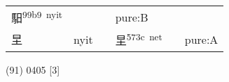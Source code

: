 \documentclass[14pt,a4paper]{scrartcl}
\begin{document}
\begin{longtable}[c]{@{}llllll@{}}
\begin{minipage}[t]{0.14\columnwidth}\raggedright\strut
馹\textsuperscript{99b9~nyit}
\strut\end{minipage} &
\begin{minipage}[t]{0.14\columnwidth}\raggedright\strut
\strut\end{minipage} &
\begin{minipage}[t]{0.14\columnwidth}\raggedright\strut
\strut\end{minipage} &
\begin{minipage}[t]{0.14\columnwidth}\raggedright\strut
pure:B
\strut\end{minipage}\tabularnewline
\begin{minipage}[t]{0.14\columnwidth}\raggedright\strut
圼
\strut\end{minipage} &
\begin{minipage}[t]{0.14\columnwidth}\raggedright\strut
nyit
\strut\end{minipage} &
\begin{minipage}[t]{0.14\columnwidth}\raggedright\strut
\strut\end{minipage} &
\begin{minipage}[t]{0.14\columnwidth}\raggedright\strut
圼\textsuperscript{573c~net}
\strut\end{minipage} &
\begin{minipage}[t]{0.14\columnwidth}\raggedright\strut
\strut\end{minipage} &
\begin{minipage}[t]{0.14\columnwidth}\raggedright\strut
pure:A
\strut\end{minipage}\tabularnewline
\bottomrule
\end{longtable}

(91) 0405 {[}3{]}
\end{document}
